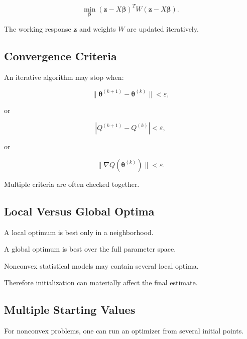 \[
\boxed{
\min_{\boldsymbol{\beta}}
(
\mathbf{z}
-
X\boldsymbol{\beta}
)^T
W
(
\mathbf{z}
-
X\boldsymbol{\beta}
).
}
\]

The working response \(\mathbf{z}\) and weights \(W\) are updated
iteratively.

\subsection{Convergence Criteria}
\label{subsec:optimization-convergence-criteria}

An iterative algorithm may stop when:

\[
\boxed{
\|
\boldsymbol{\theta}^{(k+1)}
-
\boldsymbol{\theta}^{(k)}
\|
<
\varepsilon,
}
\]

or

\[
\boxed{
|
Q^{(k+1)}
-
Q^{(k)}
|
<
\varepsilon,
}
\]

or

\[
\boxed{
\|
\nabla Q
(
\boldsymbol{\theta}^{(k)}
)
\|
<
\varepsilon.
}
\]

Multiple criteria are often checked together.

\subsection{Local Versus Global Optima}
\label{subsec:local-global-optima-statistics}

A local optimum is best only in a neighborhood.

A global optimum is best over the full parameter space.

Nonconvex statistical models may contain several local optima.

Therefore initialization can materially affect the final estimate.

\subsection{Multiple Starting Values}
\label{subsec:multiple-starting-values}

For nonconvex problems, one can run an optimizer from several initial
points.

